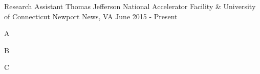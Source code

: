 

\begin{cventries}

  \cventry
    {Research Assistant} %
    {Thomas Jefferson National Accelerator Facility \& University of Connecticut} %
    {Newport News, VA} %
    {June 2015 - Present} %
    {
      \begin{cvitems} %
        \item {A}
        \item {B}
        \item {C}
      \end{cvitems}
    }

\end{cventries}
